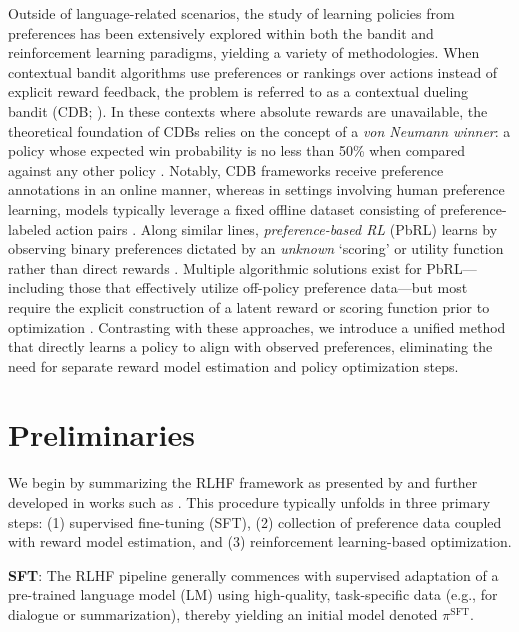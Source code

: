 Outside of language-related scenarios, the study of learning policies from preferences has been extensively explored within both the bandit and reinforcement learning paradigms, yielding a variety of methodologies. When contextual bandit algorithms use preferences or rankings over actions instead of explicit reward feedback, the problem is referred to as a contextual dueling bandit (CDB; \cite{yue2012karmed,dudik2015contextual}). In these contexts where absolute rewards are unavailable, the theoretical foundation of CDBs relies on the concept of a \textit{von Neumann winner}: a policy whose expected win probability is no less than 50\% when compared against any other policy \citep{dudik2015contextual}. Notably, CDB frameworks receive preference annotations in an online manner, whereas in settings involving human preference learning, models typically leverage a fixed offline dataset consisting of preference-labeled action pairs \citep{yan2022human}. Along similar lines, \textit{preference-based RL} (PbRL) learns by observing binary preferences dictated by an \textit{unknown} `scoring' or utility function rather than direct rewards \citep{BusaFekete2014,ruiz2023dueling}. Multiple algorithmic solutions exist for PbRL—including those that effectively utilize off-policy preference data—but most require the explicit construction of a latent reward or scoring function prior to optimization \citep{jain2013learning,BusaFekete2014,christiano2017deep,sadigh2017active,kupcsik2018learning}. Contrasting with these approaches, we introduce a unified method that directly learns a policy to align with observed preferences, eliminating the need for separate reward model estimation and policy optimization steps.

\section{Preliminaries}\label{section:prelims}

We begin by summarizing the RLHF framework as presented by \citeauthor{ziegler2020finetuning} and further developed in works such as \citep{stiennon2022learning, bai2022training, ouyang2022training}. This procedure typically unfolds in three primary steps: (1) supervised fine-tuning (SFT), (2) collection of preference data coupled with reward model estimation, and (3) reinforcement learning-based optimization.

\textbf{SFT}: The RLHF pipeline generally commences with supervised adaptation of a pre-trained language model (LM) using high-quality, task-specific data (e.g., for dialogue or summarization), thereby yielding an initial model denoted $\pi^\text{SFT}$.


